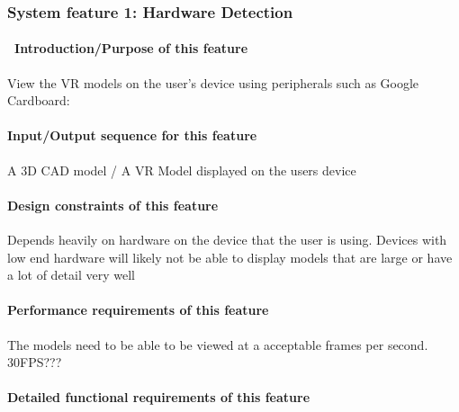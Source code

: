 \documentclass[letterpaper, 10pt, draftclsnofoot, onecolumn]{IEEEtran}
\begin{document}
{%

\subsubsection[{Viewable VR Models}]{\rmfamily\bfseries\color{black} System
feature 1: Hardware Detection}
\paragraph[\ Introduction/Purpose of this
feature]{\foreignlanguage{english}{\ }\foreignlanguage{english}{Introduction/Purpose
of this feature}}
{\color{black}
View the VR models on the user's device using peripherals such as Google Cardboard:   }

\paragraph[Input/Output sequence for this
feature]{\rmfamily\bfseries\color{black}
Input/Output sequence for this feature}
{\color{black}
A 3D CAD model / A VR Model displayed on the users device  }

\paragraph[Design constraints of this
feature]{\rmfamily\bfseries\color{black} Design
constraints of this feature}
{\color{black}
Depends heavily on hardware on the device that the user is using. Devices with low end hardware will likely not be able to display models that are large or have a lot of detail very well  }

\paragraph[Performance requirements of this
feature]{\rmfamily\bfseries\color{black}
Performance requirements of this feature}
{\color{black}
The models need to be able to be viewed at a acceptable frames per second. 30FPS???  }

\paragraph[Detailed functional requirements of this
feature]{\rmfamily\bfseries\color{black}
Detailed functional requirements of this feature}

}
\end{document}
